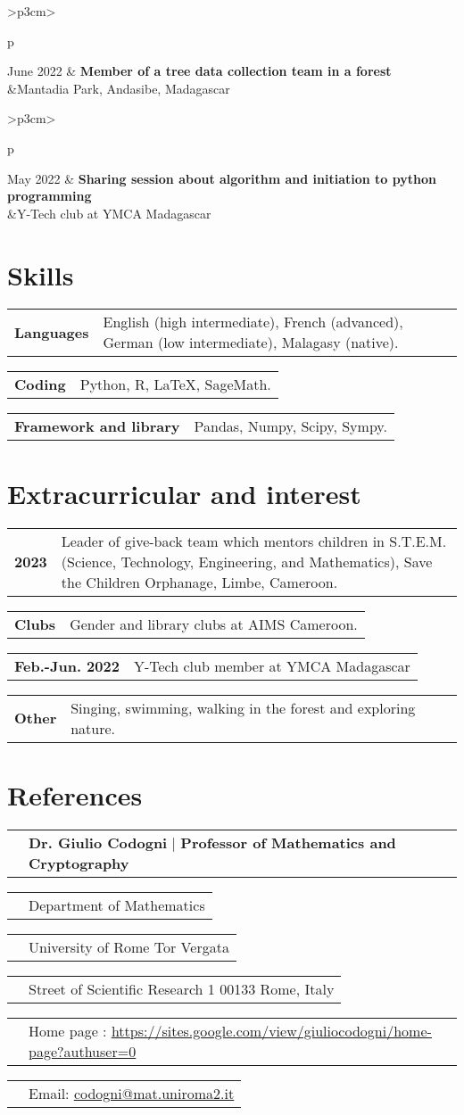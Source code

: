 \documentclass[11pt]{article}
\newcommand{\cvEduc}[3]{\begin{tabular}{>{\raggedleft\arraybackslash}p{3cm}>{\raggedright\arraybackslash}p{\linewidth}}
		#1 & \textbf{#2}  \\
		&#3 \\
\end{tabular}
\vspace*{3pt}}
\newcommand{\cvitem}[2]{\begin{tabular}{>{\raggedleft\arraybackslash}p{3cm}>{\raggedright\arraybackslash}p{16cm}}
		\textbf{#1} & #2  \\
\end{tabular}}
\newcommand{\cvRefTitle}[2]{\begin{tabular}{>{\raggedleft\arraybackslash}p{3cm}>{\raggedright\arraybackslash}p{16cm}}
		 & \textbf{#1} $|$ \textbf{#2}  \\
\end{tabular}}
\newcommand{\cvRefEntry}[1]{\begin{tabular}{>{\raggedleft\arraybackslash}p{3cm}>{\raggedright\arraybackslash}p{16cm}}
		& #1 \\
\end{tabular}}
\begin{document}
\cvEduc{June 2022}{Member of a tree data collection team in a forest}{Mantadia Park, Andasibe, Madagascar}

\cvEduc{May 2022}{Sharing session about algorithm and initiation to python programming}{Y-Tech club at YMCA Madagascar}

\section{Skills}
\cvitem{Languages}{English (high intermediate), French (advanced), German (low intermediate), Malagasy (native).}

\cvitem{Coding}{Python, R, \LaTeX, SageMath.}

\cvitem{Framework and library}{Pandas, Numpy, Scipy, Sympy.}

\section{Extracurricular and interest}
\cvitem{2023}{Leader of give-back team which mentors children in S.T.E.M. (Science, Technology, Engineering, and Mathematics), Save the Children Orphanage, Limbe, Cameroon.}

\cvitem{Clubs}{Gender and library clubs at AIMS Cameroon.}

\cvitem{Feb.-Jun. 2022}{Y-Tech club member at YMCA Madagascar}

\cvitem{Other}{Singing, swimming, walking in the forest and exploring nature.}

\section{References}
\cvRefTitle{Dr. Giulio Codogni}{Professor of Mathematics and Cryptography}

\cvRefEntry{Department of Mathematics}

\cvRefEntry{University of Rome Tor Vergata}

\cvRefEntry{Street of Scientific Research 1
	00133 Rome, Italy}

\cvRefEntry{Home page : \href{https://sites.google.com/view/giuliocodogni/home-page?authuser=0}{\color{blue}\underline{https://sites.google.com/view/giuliocodogni/home-page?authuser=0}}}



\cvRefEntry{Email: \href{mailto:codogni@mat.uniroma2.it}{\color{blue}\underline{codogni@mat.uniroma2.it}}}
\end{document}
